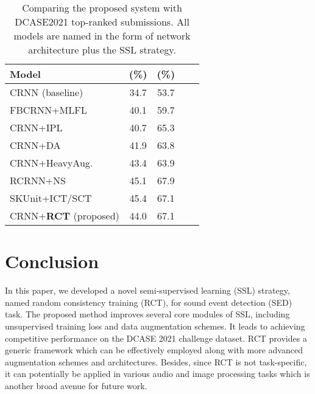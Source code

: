 \documentclass[a4paper]{article}
\begin{document}
\begin{table}[]
    \centering
    \caption{Comparing the proposed system with DCASE2021 top-ranked submissions. All models are named in the form of network architecture plus the SSL strategy.}

    \begin{tabular}{lcccc}
        \toprule
        \textbf{Model}  & \textbf{} (\%)  & \textbf{} (\%) \\
        \midrule
        CRNN (baseline) \cite{jiakai2018mean}           & 34.7 & 53.7 \\
        FBCRNN+MLFL \cite{Tian2021}                     & 40.1 & 59.7  \\
        CRNN+IPL \cite{Gong2021}                        & 40.7 & 65.3  \\
        CRNN+DA \cite{Lu2021}                           & 41.9 & 63.8  \\
        CRNN+HeavyAug. \cite{Nam2021}                   & 43.4 & 63.9  \\
        RCRNN+NS \cite{Kim2021}                         & 45.1 & 67.9  \\
        SKUnit+ICT/SCT \cite{zhang2017mixup}            & 45.4 & 67.1  \\
        CRNN+\textbf{RCT} (proposed)                    & 44.0 & 67.1  \\
        \bottomrule
    \end{tabular}
    \label{table: match_comparison}
\end{table}

\section{Conclusion}

In this paper, we developed a novel semi-supervised learning (SSL) strategy, named random consistency training (RCT), for sound event detection (SED) task. The proposed method improves several core modules of SSL, including unsupervised training loss and data augmentation schemes. It leads to achieving competitive performance on the DCASE 2021 challenge dataset. RCT provides a generic framework which can be effectively employed along with more advanced augmentation schemes and architectures. Besides, since RCT is not task-specific, it can potentially be applied in various audio and image processing tasks which is another broad avenue for future work.

\vfill\pagebreak

  \clearpage





\end{document}
